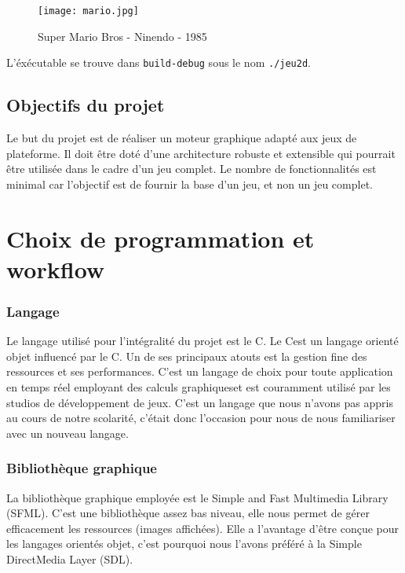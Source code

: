 \documentclass[a4paper,11pt]{article}
\newcommand{\CC}{C\nolinebreak\hspace{-.05em}\raisebox{.4ex}{\tiny\bf +}\nolinebreak\hspace{-.10em}\raisebox{.4ex}{\tiny\bf +}}
\begin{document}
\vspace{0.6cm}
\begin{figure}[h]
\begin{center}
\texttt{[image: mario.jpg]}
\caption{Super Mario Bros - Ninendo - 1985}
\end{center}
\end{figure}

L'éxécutable se trouve dans \texttt{build-debug} sous le nom \texttt{./jeu2d}.

\subsection{Objectifs du projet}
Le but du projet est de réaliser un moteur graphique adapté aux jeux de plateforme. Il doit être doté d'une architecture robuste et extensible qui pourrait être utilisée dans le cadre d'un jeu complet. Le nombre de fonctionnalités est minimal car l'objectif est de fournir la base d'un jeu, et non un jeu complet.
    
\section{Choix de programmation et workflow}
\subsubsection*{Langage}
Le langage utilisé pour l'intégralité du projet est le \CC .
Le \CC est un langage orienté objet influencé par le C. Un de ses principaux atouts est la gestion fine des ressources et ses performances. C'est un langage de choix pour toute application en temps réel employant des calculs graphiqueset est couramment utilisé par les studios de développement de jeux.
C'est un langage que nous n'avons pas appris au cours de notre scolarité, c'était donc l'occasion pour nous de nous familiariser avec un nouveau langage.

\subsubsection*{Bibliothèque graphique}
La bibliothèque graphique employée est le Simple and Fast Multimedia Library (SFML). C'est une bibliothèque assez bas niveau, elle nous permet de gérer efficacement les ressources (images affichées). Elle a l'avantage d'être conçue pour les langages orientés objet, c'est pourquoi nous l'avons préféré à la Simple DirectMedia Layer (SDL).
\end{document}
